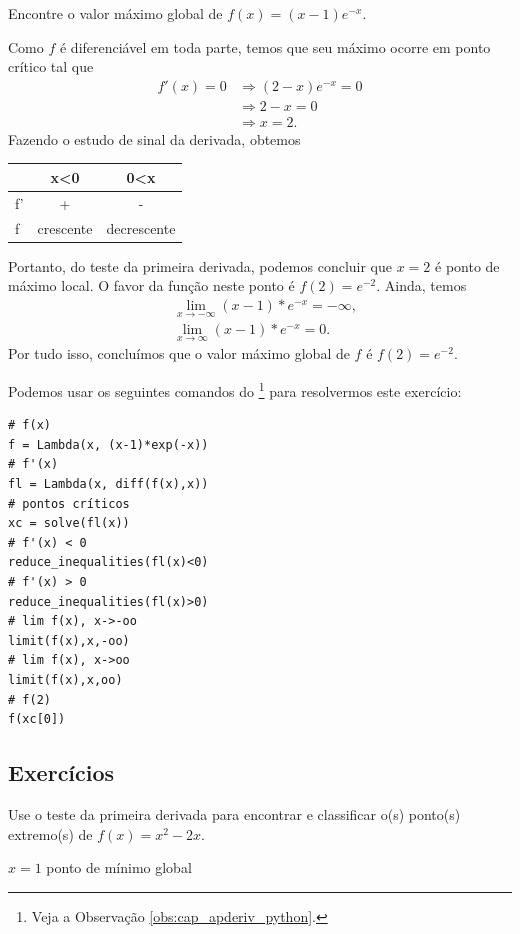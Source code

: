 \begin{exeresol}
  Encontre o valor máximo global de $f(x) = (x-1)e^{-x}$.
\end{exeresol}
\begin{resol}
  Como $f$ é diferenciável em toda parte, temos que seu máximo ocorre em ponto crítico tal que
  \begin{align}
    f'(x) = 0 &\Rightarrow (2-x)e^{-x} = 0 \\
              &\Rightarrow 2-x = 0 \\
              &\Rightarrow x = 2.
  \end{align}
  Fazendo o estudo de sinal da derivada, obtemos
  \begin{center}
    \begin{tabular}[H]{lcc}
         & x<0 & 0<x \\\hline
      f' & + & - \\
      f  & crescente & decrescente \\\hline
    \end{tabular}
  \end{center}
  Portanto, do teste da primeira derivada, podemos concluir que $x=2$ é ponto de máximo local. O favor da função neste ponto é $f(2) = e^{-2}$. Ainda, temos
  \begin{align}
    &\lim_{x\to -\infty} (x-1)*e^{-x} = -\infty, \\
    &\lim_{x\to \infty} (x-1)*e^{-x} = 0.
  \end{align}
  Por tudo isso, concluímos que o valor máximo global de $f$ é $f(2) = e^{-2}$.

  \ifispython
  Podemos usar os seguintes comandos do \sympy\footnote{Veja a Observação \ref{obs:cap_apderiv_python}.} para resolvermos este exercício:
\begin{verbatim}
# f(x)
f = Lambda(x, (x-1)*exp(-x))
# f'(x)
fl = Lambda(x, diff(f(x),x))
# pontos críticos
xc = solve(fl(x))
# f'(x) < 0
reduce_inequalities(fl(x)<0)
# f'(x) > 0
reduce_inequalities(fl(x)>0)
# lim f(x), x->-oo
limit(f(x),x,-oo)
# lim f(x), x->oo
limit(f(x),x,oo)
# f(2)
f(xc[0])
\end{verbatim}
  \fi
\end{resol}

\subsection*{Exercícios}

\begin{exer}
  Use o teste da primeira derivada para encontrar e classificar o(s) ponto(s) extremo(s) de $f(x) = x^2 - 2x$.
\end{exer}
\begin{resp}
  $x=1$ ponto de mínimo global
\end{resp}

